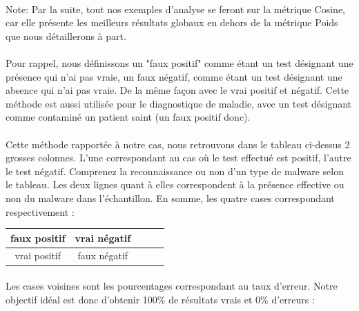 \documentclass[a4paper, 12pt]{book}
\begin{document}
\paragraph{}
Note: Par la suite, tout nos exemples d'analyse se feront sur la métrique Cosine, car elle présente les meilleurs résultats globaux en dehors de la métrique Poids que nous détaillerons à part.

\paragraph{}
Pour rappel, nous définissons un "faux positif" comme étant un test désignant une présence qui n'ai pas vraie, un faux négatif, comme étant un test désignant une absence qui n'ai pas vraie. De la même façon avec le vrai positif et négatif. Cette méthode est aussi utilisée pour le diagnostique de maladie, avec un test désignant comme contaminé un patient saint (un faux positif donc).


\paragraph{}
Cette méthode rapportée à notre cas, nous retrouvons dans le tableau ci-dessus 2 grosses colonnes. L'une correspondant au cas où le test effectué est positif, l'autre le test négatif. Comprenez la reconnaissance ou non d'un type de malware selon le tableau. Les deux lignes quant à elles correspondent à la présence effective ou non du malware dans l’échantillon. En somme, les quatre cases correspondant respectivement :

\begin{center}
\begin{tabular}{|c|c|c|c|c|}
  \hline
  faux positif & vrai négatif\\
  \hline
  vrai positif & faux négatif \\
  \hline
\end{tabular}
\end{center}

\paragraph{}
Les cases voisines sont les pourcentages correspondant au taux d'erreur. Notre objectif idéal est donc d'obtenir 100\% de résultats vrais et 0\% d'erreurs :

% 
%				
\end{document}
